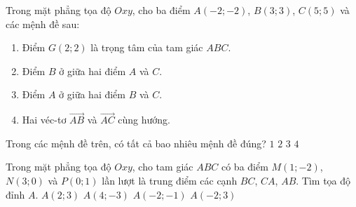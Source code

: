 \begin{ex}%
	Trong mặt phẳng tọa độ $Oxy$, cho ba điểm $A(-2;-2)$, $B(3;3)$, $C(5;5)$ và các mệnh đề sau:
	\begin{enumerate}
		\item Điểm $G(2;2)$ là trọng tâm của tam giác $ABC$.
		\item Điểm $B$ ở giữa hai điểm $A$ và $C$.
		\item Điểm $A$ ở giữa hai điểm $B$ và $C$.
		\item Hai véc-tơ $\vec{AB}$ và $\vec{AC}$ cùng hướng.
	\end{enumerate}
	Trong các mệnh đề trên, có tất cả bao nhiêu mệnh đề đúng?
	\choice
	{$1$}
	{\True $2$}
	{$3$}
	{$4$}	
	
\end{ex}

\begin{ex}%
	Trong mặt phẳng tọa độ $Oxy$, cho tam giác $ABC$ có ba điểm $M(1;-2)$, $N(3;0)$ và $P(0;1)$ lần lượt là trung điểm các cạnh $BC$, $CA$, $AB$. Tìm tọa độ đỉnh $A$.
	\choice
	{\True $A(2;3)$}
	{$A(4;-3)$}
	{$A(-2;-1)$}
	{$A(-2;3)$}
\end{ex}

